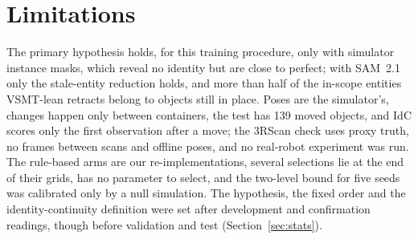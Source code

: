 \section{Limitations}
\label{sec:limitations}

The primary hypothesis holds, for this training procedure, only with simulator instance masks, which reveal no identity but are close to perfect; with SAM~2.1 only the stale-entity reduction holds, and more than half of the in-scope entities VSMT-lean retracts belong to objects still in place.
Poses are the simulator's, changes happen only between containers, the test has 139 moved objects, and IdC scores only the first observation after a move; the 3RScan check uses proxy truth, no frames between scans and offline poses, and no real-robot experiment was run.
The rule-based arms are our re-implementations, several selections lie at the end of their grids,  has no parameter to select, and the two-level bound for five seeds was calibrated only by a null simulation.
The hypothesis, the fixed order and the identity-continuity definition were set after development and confirmation readings, though before validation and test (Section~\ref{sec:stats}).
